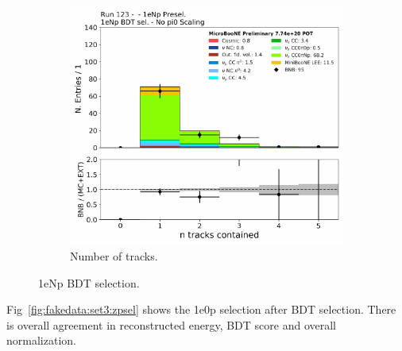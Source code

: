 \begin{figure}[H]
\begin{center}
\begin{subfigure}[b]{0.45\textwidth}
    \includegraphics[width=1.00\textwidth]{Fakedata/set3/Np_postsel_ntracks.pdf}
    \caption{\label{fig:fakedata:set3:Np_postsel_ntracks} Number of tracks.}
    \end{subfigure}
\caption{\label{fig:fakedata:set3:npsel} 1eNp BDT selection.}
\end{center}
\end{figure}

Fig~\ref{fig:fakedata:set3:zpsel} shows the 1e0p selection after BDT selection.  There is overall agreement in reconstructed energy, BDT score and overall normalization.

